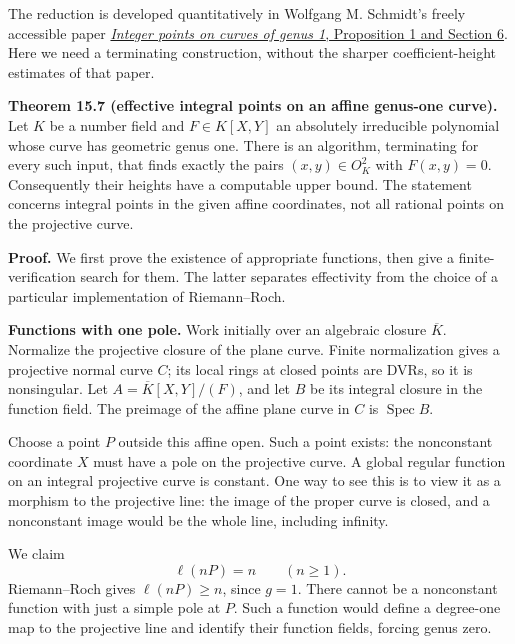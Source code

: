 \documentclass[
  11pt,
  a4paper,
]{article}
\begin{document}
The reduction is developed quantitatively in Wolfgang M. Schmidt's
freely accessible paper
\href{https://www.numdam.org/item/CM_1992__81_1_33_0.pdf}{\emph{Integer
points on curves of genus 1}, Proposition 1 and Section 6}. Here we need
a terminating construction, without the sharper coefficient-height
estimates of that paper.

\textbf{Theorem 15.7 (effective integral points on an affine genus-one
curve).} Let \(K\) be a number field and \(F\in K[X,Y]\) an absolutely
irreducible polynomial whose curve has geometric genus one. There is an
algorithm, terminating for every such input, that finds exactly the
pairs \((x,y)\in O_K^2\) with \(F(x,y)=0\). Consequently their heights
have a computable upper bound. The statement concerns integral points in
the given affine coordinates, not all rational points on the projective
curve.

\textbf{Proof.} We first prove the existence of appropriate functions,
then give a finite-verification search for them. The latter separates
effectivity from the choice of a particular implementation of
Riemann--Roch.

\textbf{Functions with one pole.} Work initially over an algebraic
closure \(\overline K\). Normalize the projective closure of the plane
curve. Finite normalization gives a projective normal curve \(C\); its
local rings at closed points are DVRs, so it is nonsingular. Let
\(A=\overline K[X,Y]/(F)\), and let \(B\) be its integral closure in the
function field. The preimage of the affine plane curve in \(C\) is
\(\operatorname{Spec}B\).

Choose a point \(P\) outside this affine open. Such a point exists: the
nonconstant coordinate \(X\) must have a pole on the projective curve. A
global regular function on an integral projective curve is constant. One
way to see this is to view it as a morphism to the projective line: the
image of the proper curve is closed, and a nonconstant image would be
the whole line, including infinity.

We claim \[
\ell(nP)=n\qquad(n\ge1).
\] Riemann--Roch gives \(\ell(nP)\ge n\), since \(g=1\). There cannot be
a nonconstant function with just a simple pole at \(P\). Such a function
would define a degree-one map to the projective line and identify their
function fields, forcing genus zero.
\end{document}
